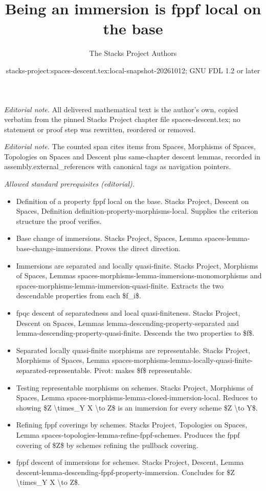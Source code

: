 \documentclass[10pt,a4paper]{amsart}
\title{Being an immersion is fppf local on the base}
\author{The Stacks Project Authors}
\date{stacks-project:spaces-descent.tex:local-snapshot-20261012; GNU FDL 1.2 or later}
\theoremstyle{plain}
\theoremstyle{definition}
\theoremstyle{remark}
\numberwithin{equation}{subsection}
\begin{document}
\maketitle
\noindent\textit{Editorial note.} All delivered mathematical text is the author's own, copied verbatim from the pinned Stacks Project chapter file spaces-descent.tex; no statement or proof step was rewritten, reordered or removed.\par\medskip
\noindent\textit{Editorial note.} The counted span cites items from Spaces, Morphisms of Spaces, Topologies on Spaces and Descent plus same-chapter descent lemmas, recorded in assembly.external\_references with canonical tags as navigation pointers.\par\medskip
\noindent\textit{Allowed standard prerequisites (editorial).}\begin{itemize}
\item Definition of a property fppf local on the base. Stacks Project, Descent on Spaces, Definition definition-property-morphisms-local. Supplies the criterion structure the proof verifies.
\item Base change of immersions. Stacks Project, Spaces, Lemma spaces-lemma-base-change-immersions. Proves the direct direction.
\item Immersions are separated and locally quasi-finite. Stacks Project, Morphisms of Spaces, Lemmas spaces-morphisms-lemma-immersions-monomorphisms and spaces-morphisms-lemma-immersion-quasi-finite. Extracts the two descendable properties from each \$f\_i\$.
\item fpqc descent of separatedness and local quasi-finiteness. Stacks Project, Descent on Spaces, Lemmas lemma-descending-property-separated and lemma-descending-property-quasi-finite. Descends the two properties to \$f\$.
\item Separated locally quasi-finite morphisms are representable. Stacks Project, Morphisms of Spaces, Lemma spaces-morphisms-lemma-locally-quasi-finite-separated-representable. Pivot: makes \$f\$ representable.
\item Testing representable morphisms on schemes. Stacks Project, Morphisms of Spaces, Lemma spaces-morphisms-lemma-closed-immersion-local. Reduces to showing \$Z \textbackslash{}times\_Y X \textbackslash{}to Z\$ is an immersion for every scheme \$Z \textbackslash{}to Y\$.
\item Refining fppf coverings by schemes. Stacks Project, Topologies on Spaces, Lemma spaces-topologies-lemma-refine-fppf-schemes. Produces the fppf covering of \$Z\$ by schemes refining the pullback covering.
\item fppf descent of immersions for schemes. Stacks Project, Descent, Lemma descent-lemma-descending-fppf-property-immersion. Concludes for \$Z \textbackslash{}times\_Y X \textbackslash{}to Z\$.
\end{itemize}\medskip
\end{document}

